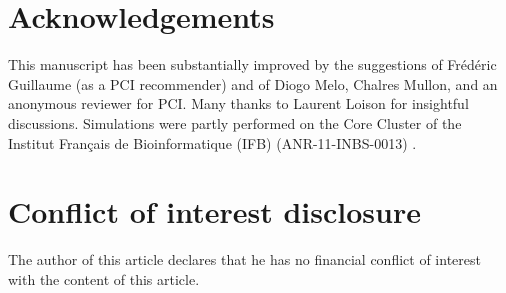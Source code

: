 \documentclass[10pt,a4paper]{article}
\begin{document}
\section*{Acknowledgements}

This manuscript has been substantially improved by the suggestions of Frédéric Guillaume (as a PCI recommender) and of Diogo Melo, Chalres Mullon, and an anonymous reviewer for PCI. Many thanks to Laurent Loison for insightful discussions. Simulations were partly performed on the Core Cluster of the Institut Français de Bioinformatique (IFB) (ANR-11-INBS-0013) .

\section*{Conflict of interest disclosure}

The author of this article declares that he has no financial conflict of interest with the content of this article.

\printbibliography

\clearpage
\end{document}
